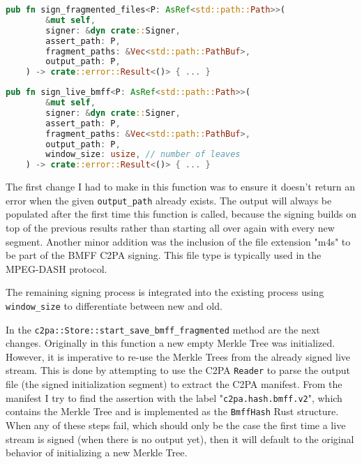\begin{minipage}{\linewidth}
\begin{lstlisting}[caption={Original Signing Function}, label=code:fragment_bmff, language=Rust, captionpos=b]
    pub fn sign_fragmented_files<P: AsRef<std::path::Path>>(
        &mut self,
        signer: &dyn crate::Signer,
        assert_path: P,
        fragment_paths: &Vec<std::path::PathBuf>,
        output_path: P,
    ) -> crate::error::Result<()> { ... }
\end{lstlisting}
\end{minipage}

\begin{minipage}{\linewidth}
\begin{lstlisting}[caption={New Live Signing Function}, label=code:live_sign, language=Rust, captionpos=b]
    pub fn sign_live_bmff<P: AsRef<std::path::Path>>(
        &mut self,
        signer: &dyn crate::Signer,
        assert_path: P,
        fragment_paths: &Vec<std::path::PathBuf>,
        output_path: P,
        window_size: usize, // number of leaves
    ) -> crate::error::Result<()> { ... }
\end{lstlisting}
\end{minipage}

The first change I had to make in this function was to ensure it doesn't return an error when the given \texttt{output\_path} already exists. The output will always be populated after the first time this function is called, because the signing builds on top of the previous results rather than starting all over again with every new segment. Another minor addition was the inclusion of the file extension "m4s" to be part of the BMFF C2PA signing. This file type is typically used in the MPEG-DASH protocol.

The remaining signing process is integrated into the existing process using \texttt{window\_size} to differentiate between new and old.

In the \texttt{c2pa::Store::start\_save\_bmff\_fragmented} method are the next changes. Originally in this function a new empty Merkle Tree was initialized. However, it is imperative to re-use the Merkle Trees from the already signed live stream. This is done by attempting to use the C2PA \texttt{Reader} to parse the output file (the signed initialization segment) to extract the C2PA manifest. From the manifest I try to find the assertion with the label "\texttt{c2pa.hash.bmff.v2}", which contains the Merkle Tree and is implemented as the \texttt{BmffHash} Rust structure. When any of these steps fail, which should only be the case the first time a live stream is signed (when there is no output yet), then it will default to the original behavior of initializing a new Merkle Tree.

